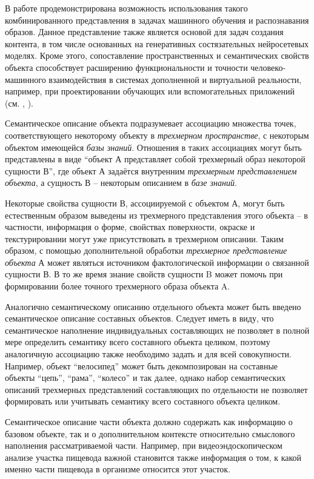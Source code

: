 В работе  продемонстрирована возможность использования такого комбинированного представления в задачах машинного обучения и распознавания образов. Данное представление также является основой для задач создания контента, в том числе основанных на генеративных состязательных нейросетевых моделях. Кроме этого, сопоставление пространственных и семантических свойств объекта способствует расширению функциональности и точности человеко-машинного взаимодействия в системах дополненной и виртуальной реальности, например, при проектировании обучающих или вспомогательных приложений (см. , ).

Семантическое описание объекта подразумевает ассоциацию множества точек, соответствующего некоторому объекту в \textit{трехмерном пространстве}, с некоторым объектом имеющейся \textit{базы знаний}. Отношения в таких ассоциациях могут быть представлены в виде ``объект А представляет собой трехмерный образ некоторой сущности В'', где объект А задаётся внутренним \textit{трехмерным представлением объекта}, а сущность В -- некоторым описанием в \textit{базе знаний}.

Некоторые свойства сущности В, ассоциируемой с объектом А, могут быть естественным образом выведены из трехмерного представления этого объекта -- в частности, информация о форме, свойствах поверхности, окраске и текстурировании могут уже присутствовать в трехмерном описании. Таким образом, с помощью дополнительной обработки \textit{трехмерное представление объекта} А может являться источником фактологической информации о связанной сущности В. В то же время знание свойств сущности B может помочь при формировании более точного трехмерного образа объекта A. 

Аналогично семантическому описанию отдельного объекта может быть введено семантическое описание составных объектов. Следует иметь в виду, что семантическое наполнение индивидуальных составляющих не позволяет в полной мере определить семантику всего составного объекта целиком, поэтому аналогичную ассоциацию также необходимо задать и для всей совокупности. Например, объект ``велосипед'' может быть декомпозирован на составные объекты ``цепь'', ``рама'', ``колесо'' и так далее, однако набор семантических описаний трехмерных представлений составляющих по отдельности не позволяет формировать или учитывать семантику всего составного объекта целиком.

Семантическое описание части объекта должно содержать как информацию о базовом объекте, так и о дополнительном контексте относительно смыслового наполнения рассматриваемой части. Например, при видеоэндоскопическом анализе участка пищевода важной становится также информация о том, к какой именно части пищевода в организме относится этот участок.

